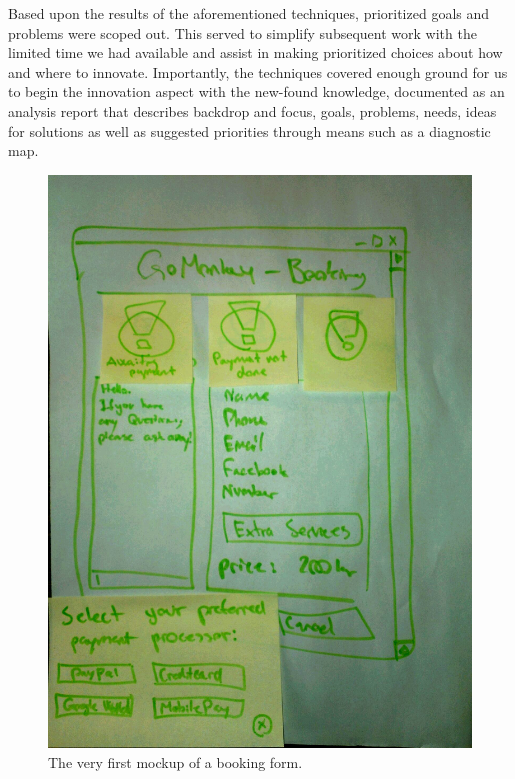 Based upon the results of the aforementioned techniques, prioritized goals and
problems were scoped out. This served to simplify subsequent work with the
limited time we had available and assist in making prioritized choices about how and
where to innovate. Importantly, the techniques covered enough ground for us to
begin the innovation aspect with the new-found knowledge, documented as an
analysis report\cite[p. 159]{bodker2004participatory} that describes backdrop
and focus, goals, problems, needs, ideas for solutions as well as suggested
priorities through means such as a diagnostic map.

\begin{figure}
    \includegraphics[width=\textwidth]{figures/mockup1}
    \caption{The very first mockup of a booking form. \label{fig:first_mockup}}
\end{figure}

